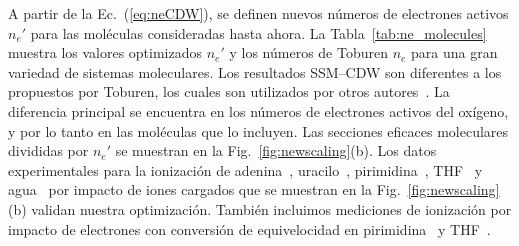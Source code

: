 A partir de la Ec.~(\ref{eq:neCDW}), se definen nuevos números de 
electrones activos $n_e'$ para las moléculas consideradas hasta ahora.  
La Tabla~\ref{tab:ne_molecules} muestra los valores optimizados $n_e'$ y 
los números de Toburen $n_e$ para una gran variedad de sistemas 
moleculares. Los resultados SSM--CDW son diferentes a los propuestos por 
Toburen, los cuales son utilizados por otros autores~\cite{itoh2013}. La 
diferencia principal se encuentra en los números de electrones activos 
del oxígeno, y por lo tanto en las moléculas que lo incluyen. Las 
secciones eficaces moleculares divididas por $n_e'$ se muestran en la 
Fig.~\ref{fig:newscaling}(b). Los datos experimentales para la 
ionización de adenina~\cite{Iriki:11,Sens:20,Bhattacharjee:19}, 
uracilo~\cite{itoh2013,Sens:20}, pirimidina~\cite{wolff2014}, 
THF~\cite{wang2016} y agua~\cite{Luna2007,Bolorizadeh86,H_Rudd85,
toburen80,Ohsawa05,He_Rudd85,DalCappello:09,Bhattacharjee:17,
Bhattacharjee:16} por impacto de iones cargados que se muestran en la 
Fig.~\ref{fig:newscaling}(b) validan nuestra optimización. También 
incluimos mediciones de ionización por impacto de electrones con 
conversión de equivelocidad en pirimidina~\cite{bug2017} y 
THF~\cite{bug2017,wolf2019,fuss2009}. 

